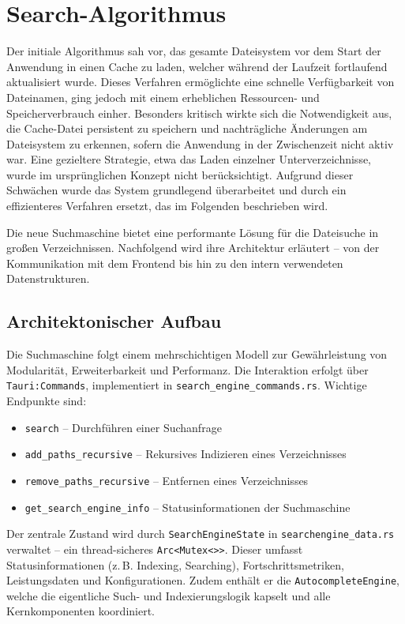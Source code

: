 \section{Search-Algorithmus}

Der initiale Algorithmus sah vor, das gesamte Dateisystem vor dem Start der Anwendung in einen Cache zu laden, welcher während der Laufzeit fortlaufend aktualisiert wurde.
 Dieses Verfahren ermöglichte eine schnelle Verfügbarkeit von Dateinamen, ging jedoch mit einem erheblichen Ressourcen- und Speicherverbrauch einher.
Besonders kritisch wirkte sich die Notwendigkeit aus, die Cache-Datei persistent zu speichern und nachträgliche Änderungen am Dateisystem zu erkennen, sofern die Anwendung in der Zwischenzeit nicht aktiv war.
Eine gezieltere Strategie, etwa das Laden einzelner Unterverzeichnisse, wurde im ursprünglichen Konzept nicht berücksichtigt.
Aufgrund dieser Schwächen wurde das System grundlegend überarbeitet und durch ein effizienteres Verfahren ersetzt, das im Folgenden beschrieben wird.

Die neue Suchmaschine bietet eine performante Lösung für die Dateisuche in großen Verzeichnissen.
Nachfolgend wird ihre Architektur erläutert – von der Kommunikation mit dem Frontend bis hin zu den intern verwendeten Datenstrukturen.
\subsection{Architektonischer Aufbau}

Die Suchmaschine folgt einem mehrschichtigen Modell zur Gewährleistung von Modularität, Erweiterbarkeit und Performanz.
Die Interaktion erfolgt über \verb|Tauri:Commands|, implementiert in \verb|search_engine_commands.rs|.
Wichtige Endpunkte sind:

\begin{itemize}
  \item \texttt{search} – Durchführen einer Suchanfrage
  \item \texttt{add\_paths\_recursive} – Rekursives Indizieren eines Verzeichnisses
  \item \texttt{remove\_paths\_recursive} – Entfernen eines Verzeichnisses
  \item \texttt{get\_search\_engine\_info} – Statusinformationen der Suchmaschine
\end{itemize}

Der zentrale Zustand wird durch \verb|SearchEngineState| in \verb|searchengine_data.rs| verwaltet – ein thread-sicheres \verb|Arc<Mutex<>>|.
Dieser umfasst Statusinformationen (z.\,B. Indexing, Searching), Fortschrittsmetriken, Leistungsdaten und Konfigurationen.
Zudem enthält er die \verb|AutocompleteEngine|, welche die eigentliche Such- und Indexierungslogik kapselt und alle Kernkomponenten koordiniert.

